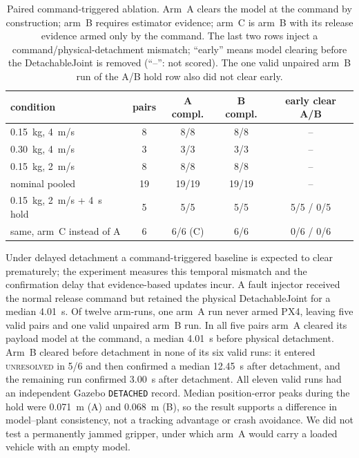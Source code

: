 \begin{table}[tb]
\caption{Paired command-triggered ablation. Arm~A clears the model at the command by
construction; arm~B requires estimator evidence; arm~C is arm~B with its release evidence armed
only by the command. The last two rows inject a command/physical-detachment mismatch; ``early''
means model clearing before the DetachableJoint is removed (``--'': not scored). The one valid
unpaired arm~B run of the A/B hold row also did not clear early.}
\label{tab:paired-event}
\centering
\scriptsize
\setlength{\tabcolsep}{2.5pt}
\begin{tabular}{@{}lcccc@{}}
\toprule
condition & pairs & A compl. & B compl. & early clear A/B \\
\midrule
\SI{0.15}{kg}, \SI{4}{m/s} & 8 & 8/8 & 8/8 & -- \\
\SI{0.30}{kg}, \SI{4}{m/s} & 3 & 3/3 & 3/3 & -- \\
\SI{0.15}{kg}, \SI{2}{m/s} & 8 & 8/8 & 8/8 & -- \\
\midrule
nominal pooled & 19 & 19/19 & 19/19 & -- \\
\SI{0.15}{kg}, \SI{2}{m/s} + \SI{4}{s} hold & 5 & 5/5 & 5/5 & 5/5 / 0/5 \\
\quad same, arm~C instead of A & 6 & 6/6 (C) & 6/6 & 0/6 / 0/6 \\
\bottomrule
\end{tabular}
\end{table}

Under delayed detachment a command-triggered baseline is expected to clear prematurely; the
experiment measures this temporal mismatch and the confirmation delay that evidence-based updates
incur. A fault injector received the normal release command but retained the physical
DetachableJoint for a median \SI{4.01}{s}. Of twelve arm-runs, one arm~A run never armed PX4,
leaving five valid pairs and one valid unpaired arm~B run. In all five pairs arm~A cleared its
payload model at the command, a median \SI{4.01}{s} before physical detachment. Arm~B cleared
before detachment in none of its six valid runs: it entered \textsc{unresolved} in 5/6 and then
confirmed a median \SI{12.45}{s} after detachment, and the remaining run confirmed \SI{3.00}{s}
after detachment. All eleven valid runs had an independent Gazebo \texttt{DETACHED} record.
Median position-error peaks during the hold were \SI{0.071}{m} (A) and \SI{0.068}{m} (B), so the
result supports a difference in model--plant consistency, not a tracking advantage or crash
avoidance. We did not test a permanently jammed gripper, under which arm~A would carry a loaded
vehicle with an empty model.

